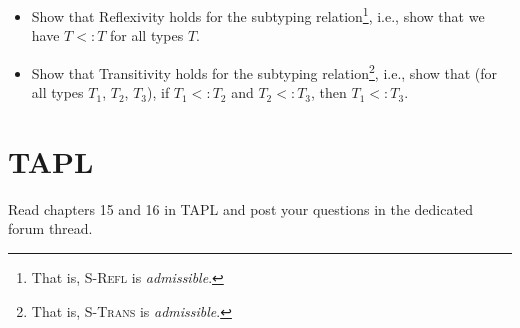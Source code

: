 \begin{itemize}
  \item Show that Reflexivity holds for the subtyping relation\footnote{That is, \textsc{S-Refl} is \emph{admissible}.},
    i.e., show that we have $T<:T$ for all types $T$.
  \item  Show that Transitivity holds for the subtyping relation\footnote{That is, \textsc{S-Trans} is \emph{admissible}.},
    i.e., show that (for all types $T_1$, $T_2$, $T_3$), if $T_1 <: T_2$ and $T_2 <: T_3$, then $T_1 <: T_3$.
\end{itemize}

\section{TAPL}
Read chapters 15 and 16 in TAPL and post your questions in the dedicated forum thread.


